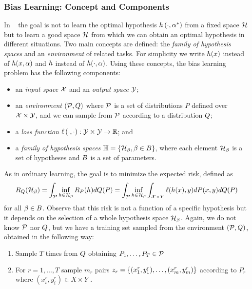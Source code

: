 \subsubsection*{Bias Learning: Concept and Components}
In ~\cite{baxter2000model} the goal is not to learn the optimal hypothesis $h\left(\cdot, \alpha^*\right)$ from a fixed space $\mathcal{H}$ but to learn a good space $\mathcal{H}$ from which we can obtain an optimal hypothesis in different situations.
%
Two main concepts are defined: the \emph{family of hypothesis spaces} and an \emph{environment} of related tasks. 
For simplicity we write $h(x)$ instead of $h(x, \alpha)$ and $h$ instead of $h(\cdot, \alpha)$.
Using these concepts, the bias learning problem has the following components:
\begin{itemize}
    \item an \emph{input space} $\mathcal{X}$ and an \emph{output space} $\mathcal{Y}$;
    \item an \emph{environment} $(\mathcal{P}, Q)$ where $\mathcal{P}$ is a set of distributions $P$ defined over $\mathcal{X} \times \mathcal{Y}$, and we can sample from $\mathcal{P}$ according to a distribution $Q$;
    \item a \emph{loss function} $\ell\left( \cdot, \cdot\right):\mathcal{Y} \times \mathcal{Y} \to \mathbb{R}$; and
    \item a \emph{family of hypothesis spaces} $\mathbb{H} = \left\{\mathcal{H}_\beta, \beta \in B\right\}$, where each element $\mathcal{H}_\beta$ is a set of hypotheses and $B$ is a set of parameters.
\end{itemize}
As in ordinary learning, the goal is to minimize the expected risk, defined as
\begin{equation}\label{eq:biaslearn_exprisk}
    \bexprisk(\hypspace_\fparam) = \int_{\bprobspace} \inf_{\hypf \in \hypspace_\fparam} \risk_P(\hypf) d\bdistf(P) = \int_{\bprobspace} \inf_{\hypf \in \hypspace_\fparam} \int_{\Xspace \times Y} \lossf(h(x), y) dP(x, y) d\bdistf(P)
\end{equation}
for all $\beta \in B$.
Observe that this risk is not a function of a specific hypothesis but it depends on the selection of a whole hypothesis space $\mathcal{H}_\beta$.
Again, we do not know $\mathcal{P}$ nor $Q$, but we have a training set sampled from the environment $(\mathcal{P}, Q)$, obtained in the following way:
\begin{enumerate}
    \item Sample $T$ times from $Q$ obtaining $P_1, \ldots, P_T \in \mathcal{P}$
    \item For $r=1, \ldots, T$ sample $m_r$ pairs $z_r = \{(x_1^r, y_1^r), \ldots, (x_m^r, y_m^r)\}$ according to $P_r$ where $(x_i^r, y_i^r) \in X \times Y$ .
\end{enumerate}
